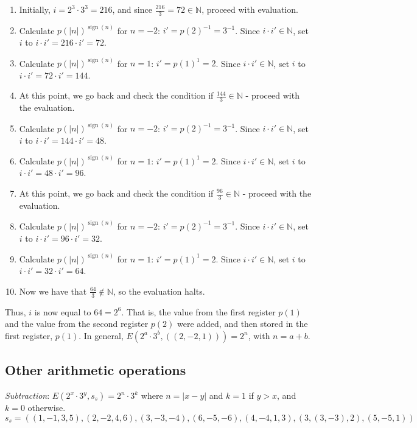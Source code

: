 \documentclass{article}
\DeclareMathOperator{\sign}{sign}
\begin{document}
\begin{enumerate}
\item Initially, $i = 2^3 \cdot 3^3 = 216$, and since $\frac{216}{3} = 72 \in \mathbb{N}$, proceed with evaluation.
\item Calculate $p(|n|)^{\sign(n)}$ for $n = -2$: $i' = p(2)^{-1} = 3^{-1}$. Since $i \cdot i' \in \mathbb{N}$, set $i$ to $i \cdot i' = 216 \cdot i' = 72$.
\item Calculate $p(|n|)^{\sign(n)}$ for $n = 1$: $i' = p(1)^{1} = 2$. Since $i \cdot i' \in \mathbb{N}$, set $i$ to $i \cdot i' = 72 \cdot i' = 144$.
\item At this point, we go back and check the condition if $\frac{144}{3} \in \mathbb{N}$ - proceed with the evaluation.
\item Calculate $p(|n|)^{\sign(n)}$ for $n = -2$: $i' = p(2)^{-1} = 3^{-1}$. Since $i \cdot i' \in \mathbb{N}$, set $i$ to $i \cdot i' = 144 \cdot i' = 48$.
\item Calculate $p(|n|)^{\sign(n)}$ for $n = 1$: $i' = p(1)^{1} = 2$. Since $i \cdot i' \in \mathbb{N}$, set $i$ to $i \cdot i' = 48 \cdot i' = 96$.
\item At this point, we go back and check the condition if $\frac{96}{3} \in \mathbb{N}$ - proceed with the evaluation.
\item Calculate $p(|n|)^{\sign(n)}$ for $n = -2$: $i' = p(2)^{-1} = 3^{-1}$. Since $i \cdot i' \in \mathbb{N}$, set $i$ to $i \cdot i' = 96 \cdot i' = 32$.
\item Calculate $p(|n|)^{\sign(n)}$ for $n = 1$: $i' = p(1)^{1} = 2$. Since $i \cdot i' \in \mathbb{N}$, set $i$ to $i \cdot i' = 32 \cdot i' = 64$.
\item Now we have that $\frac{64}{3} \notin \mathbb{N}$, so the evaluation halts.
\end{enumerate}

Thus, $i$ is now equal to $64 = 2^6$. That is, the value from the first register $p(1)$ and the value from the second register $p(2)$ were added, and then stored in the first register, $p(1)$. In general, $E(2^a \cdot 3^b, ((2, -2, 1))) = 2^n$, with $n = a + b$.

\subsection{Other arithmetic operations}

\textit{Subtraction}: $E(2^x \cdot 3^y, s_s) = 2^n \cdot 3^k$ where $n = |x - y|$ and $k = 1$ if $y > x$, and $k = 0$ otherwise.
$$s_s = ((1, -1, 3, 5), (2, -2, 4, 6), (3, -3, -4), (6, -5, -6), (4, -4, 1, 3), (3, (3, -3), 2), (5, -5, 1))$$
\end{document}
